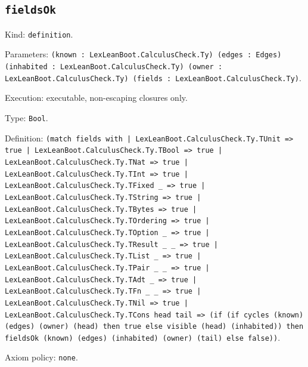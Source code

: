 \documentclass[11pt]{article}
\begin{document}
\subsection*{\texttt{fieldsOk}}
\noindent Kind: \texttt{definition}.\par
\noindent Parameters: \texttt{(known : LexLeanBoot.CalculusCheck.Ty) (edges : Edges) (inhabited : LexLeanBoot.CalculusCheck.Ty) (owner : LexLeanBoot.CalculusCheck.Ty) (fields : LexLeanBoot.CalculusCheck.Ty)}.\par
\noindent Execution: executable, non-escaping closures only.\par
\noindent Type: \texttt{Bool}.\par
\noindent Definition: \texttt{(match fields with | LexLeanBoot.CalculusCheck.Ty.TUnit => true | LexLeanBoot.CalculusCheck.Ty.TBool => true | LexLeanBoot.CalculusCheck.Ty.TNat => true | LexLeanBoot.CalculusCheck.Ty.TInt => true | LexLeanBoot.CalculusCheck.Ty.TFixed \_ => true | LexLeanBoot.CalculusCheck.Ty.TString => true | LexLeanBoot.CalculusCheck.Ty.TBytes => true | LexLeanBoot.CalculusCheck.Ty.TOrdering => true | LexLeanBoot.CalculusCheck.Ty.TOption \_ => true | LexLeanBoot.CalculusCheck.Ty.TResult \_ \_ => true | LexLeanBoot.CalculusCheck.Ty.TList \_ => true | LexLeanBoot.CalculusCheck.Ty.TPair \_ \_ => true | LexLeanBoot.CalculusCheck.Ty.TAdt \_ => true | LexLeanBoot.CalculusCheck.Ty.TFn \_ \_ => true | LexLeanBoot.CalculusCheck.Ty.TNil => true | LexLeanBoot.CalculusCheck.Ty.TCons head tail => (if (if cycles (known) (edges) (owner) (head) then true else visible (head) (inhabited)) then fieldsOk (known) (edges) (inhabited) (owner) (tail) else false))}.\par
\noindent Axiom policy: \texttt{none}.\par
\end{document}
